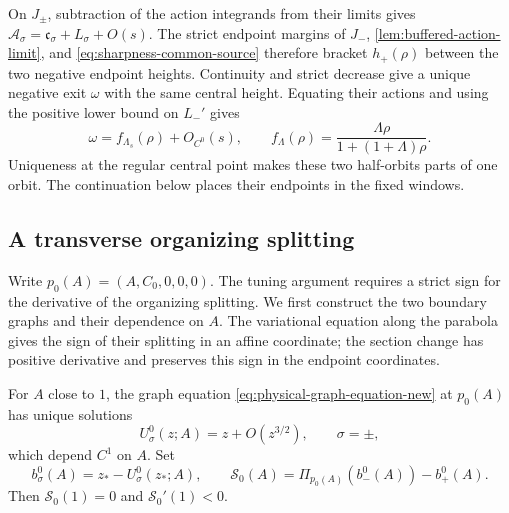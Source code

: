 On \(J_\pm\), subtraction of the action integrands from their limits
gives \(\mathcal A_\sigma=\mathfrak c_\sigma+L_\sigma+O(s)\).
The strict endpoint margins of \(J_-\),
\cref{lem:buffered-action-limit}, and
\eqref{eq:sharpness-common-source} therefore bracket
\(h_+(\rho)\) between the two negative endpoint heights.
Continuity and strict decrease give a unique negative exit \(\omega\)
with the same central height. Equating their actions and using the
positive lower bound on \(L_-'\) gives
\begin{equation}
\label{eq:sharpness-negative-exit}
 \omega=f_{\Lambda_s}(\rho)+O_{C^0}(s),\qquad
 f_\Lambda(\rho)=\frac{\Lambda\rho}{1+(1+\Lambda)\rho}.
\end{equation}
Uniqueness at the regular central point makes these two half-orbits
parts of one orbit. The continuation below places their endpoints
in the fixed windows.

\subsection{A transverse organizing splitting}

Write \(p_0(A)=(A,C_0,0,0,0)\). The tuning argument requires a
strict sign for the derivative of the organizing splitting. We first
construct the two boundary graphs and their dependence on \(A\).
The variational equation along the parabola gives the sign of their
splitting in an affine coordinate; the section change has positive
derivative and preserves this sign in the endpoint coordinates.

\begin{lemma}
\label{lem:organizing-splitting-transversality}
For \(A\) close to \(1\), the graph equation
\eqref{eq:physical-graph-equation-new} at \(p_0(A)\) has unique
solutions
\[
 U_\sigma^0(z;A)=z+O(z^{3/2}),\qquad \sigma=\pm,
\]
which depend \(C^1\) on \(A\). Set
\[
 b_\sigma^0(A)=z_*-U_\sigma^0(z_*;A),\qquad
 \mathcal S_0(A)=\Pi_{p_0(A)}(b_-^0(A))-b_+^0(A).
\]
Then \(\mathcal S_0(1)=0\) and \(\mathcal S_0'(1)<0\).
\end{lemma}

